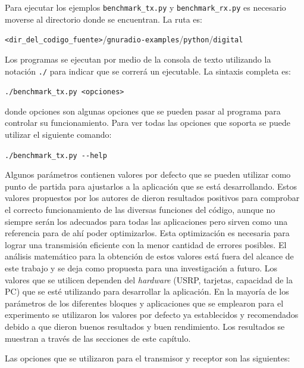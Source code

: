 Para ejecutar los ejemplos \verb|benchmark_tx.py| y \verb|benchmark_rx.py| es necesario moverse al
directorio donde se encuentran. La ruta es:
\begin{center}
\verb|<dir_del_codigo_fuente>|/\verb|gnuradio-examples|/\verb|python|/\verb|digital|
\end{center}
Los programas se ejecutan por medio de la consola de texto utilizando la notaci\'on \verb|./| para
indicar que se correr\'a un ejecutable. La sintaxis completa es:
\begin{center}
\verb|./benchmark_tx.py <opciones>|
\end{center}
donde opciones son algunas opciones que se pueden pasar al programa para controlar su
funcionamiento. Para ver todas las opciones que soporta se puede utilizar el siguiente comando:
\begin{center}
\verb|./benchmark_tx.py --help|
\end{center}

Algunos par\'ametros contienen valores por defecto que se pueden utilizar como punto de partida para ajustarlos a la
aplicaci\'on que se est\'a desarrollando. Estos valores propuestos por los autores de \gnuradio dieron resultados positivos para
comprobar el correcto funcionamiento de las diversas funciones del c\'odigo, aunque no siempre ser\'an los adecuados
para todas las aplicaciones pero sirven como una referencia para de ah\'i poder optimizarlos. Esta optimizaci\'on es necesaria para
lograr una transmisi\'on eficiente con la menor cantidad de errores posibles. El an\'alisis matem\'atico para la obtenci\'on de
estos valores est\'a fuera del alcance de este trabajo y se deja como propuesta para una investigaci\'on a futuro. Los valores que
se utilicen dependen del \emph{hardware} (USRP, tarjetas, capacidad de la PC) que se est\'e utilizando para desarrollar la
aplicaci\'on. En la mayor\'ia de los par\'ametros de los diferentes bloques y aplicaciones que se emplearon para el experimento
se utilizaron los valores por defecto ya establecidos y recomendados debido a que dieron buenos resultados y buen rendimiento.
Los resultados se muestran a trav\'es de las secciones de este cap\'itulo.

Las opciones que se utilizaron para el transmisor y receptor son las siguientes:

